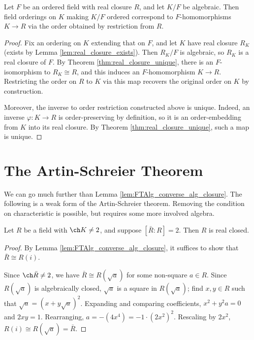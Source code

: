 \begin{lemma}
  \label{lem:ord_alg_ext_eq_emb}
  Let $F$ be an ordered field with real closure $R$, and let $K/F$ be algebraic. Then field orderings on $K$ making $K/F$ ordered correspond to $F$-homomorphisms $K\to R$ via the order obtained by restriction from $R$.
\end{lemma}
\begin{proof}
  Fix an ordering on $K$ extending that on $F$, and let $K$ have real closure $R_K$ (exists by Lemma \ref{lem:real_closure_exists}). Then $R_K/F$ is algebraic, so $R_K$ is a real closure of $F$. By Theorem \ref{thm:real_closure_unique}, there is an $F$-isomorphism to $R_K\cong R$, and this induces an $F$-homomorphism $K\to R$. Restricting the order on $R$ to $K$ via this map recovers the original order on $K$ by construction.
  
  Moreover, the inverse to order restriction constructed above is unique. Indeed, an inverse $\varphi:K\to R$ is order-preserving by definition, so it is an order-embedding from $K$ into its real closure. By Theorem \ref{thm:real_closure_unique}, such a map is unique.
\end{proof}

\section{The Artin-Schreier Theorem}

We can go much further than Lemma \ref{lem:FTAlg_converse_alg_closure}. The following is a weak form of the Artin-Schreier theorem. Removing the condition on characteristic is possible, but requires some more involved algebra.

\begin{theorem}
  \label{thm:Artin-Schreier_weak}
  \leanok
  Let $R$ be a field with $\ch K\neq2$, and suppose $[\bar{R}:R]=2$. Then $R$ is real closed.
\end{theorem}
\begin{proof}
  By Lemma \ref{lem:FTAlg_converse_alg_closure}, it suffices to show that $\bar{R}\cong R(i)$.

  Since $\ch\bar{R}\neq 2$, we have $\bar{R}\cong R(\sqrt{a})$ for some non-square $a\in R$. Since $R(\sqrt{a})$ is algebraically closed, $\sqrt{a}$ is a square in $R(\sqrt{a})$; find $x,y\in R$ such that $\sqrt{a}=(x+y\sqrt{a})^2$. Expanding and comparing coefficients, $x^2+y^2a=0$ and $2xy=1$. Rearranging, $a=-(4x^4)=-1\cdot(2x^2)^2$. Rescaling by $2x^2$, $R(i)\cong R(\sqrt{a})=\bar{R}$.
\end{proof}

